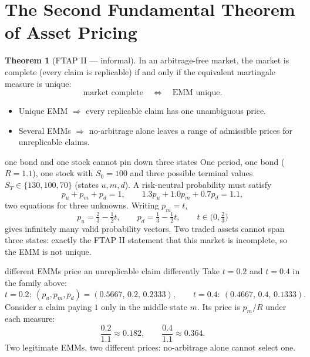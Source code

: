 \documentclass[10pt]{article}
\newcommand{\1}{\mathbf 1}
\theoremstyle{definition}
\newtheorem{theorem}[definition]{Theorem}
\begin{document}
\section{The Second Fundamental Theorem of Asset Pricing}

\begin{theorem}[FTAP II --- informal]
In an arbitrage-free market, the market is complete (every claim is
replicable) if and only if the equivalent martingale measure is unique:
\[
\boxed{
\text{market complete}
\quad\Longleftrightarrow\quad
\text{EMM unique}.}
\]
\end{theorem}

\begin{itemize}
  \item Unique EMM \(\Longrightarrow\) every replicable claim has one
        unambiguous price.
  \item Several EMMs \(\Longrightarrow\) no-arbitrage alone leaves a range of
        admissible prices for unreplicable claims.
\end{itemize}

\begin{boardexample}{one bond and one stock cannot pin down three states}
One period, one bond (\(R=1.1\)), one stock with \(S_0=100\) and three
possible terminal values \(S_T\in\{130,100,70\}\) (states \(u,m,d\)). A
risk-neutral probability must satisfy
\[
p_u+p_m+p_d=1,
\qquad
1.3p_u+1.0p_m+0.7p_d=1.1,
\]
two equations for three unknowns. Writing \(p_m=t\),
\[
p_u=\tfrac23-\tfrac12t,
\qquad
p_d=\tfrac13-\tfrac12t,
\qquad
t\in\bigl(0,\tfrac23\bigr)
\]
gives infinitely many valid probability vectors. Two traded assets cannot
span three states: exactly the FTAP II statement that this market is
incomplete, so the EMM is not unique.
\end{boardexample}

\begin{boardexample}{different EMMs price an unreplicable claim differently}
Take \(t=0.2\) and \(t=0.4\) in the family above:
\[
t=0.2:\ (p_u,p_m,p_d)=(0.5667,\,0.2,\,0.2333),
\qquad
t=0.4:\ (0.4667,\,0.4,\,0.1333).
\]
Consider a claim paying \(1\) only in the middle state \(m\). Its price is
\(p_m/R\) under each measure:
\[
\frac{0.2}{1.1}\approx0.182,
\qquad
\frac{0.4}{1.1}\approx0.364.
\]
Two legitimate EMMs, two different prices: no-arbitrage alone cannot select
one.
\end{boardexample}
\end{document}
